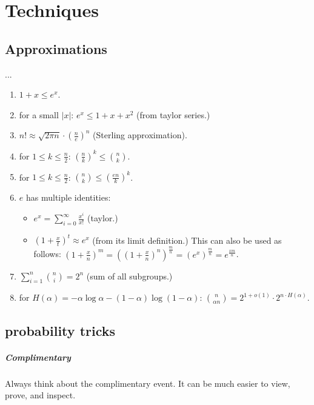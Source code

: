 \chapter{Techniques}
\section{Approximations}
...
\begin{enumerate}
    \item $1+x \le e^x$.
    \item for a small $|x|$: $e^x \le 1+x+x^2$ (from taylor series.)
    \item $n! \approx \sqrt{2\pi n} \cdot \left( \frac{n}{e}\right)^n$ (Sterling approximation).
    \item for $1\le k \le \frac{n}{2}$: $\left( \frac{n}{k}\right)^k \le \binom{n}{k}$.
    \item for $1\le k \le \frac{n}{2}$: $\binom{n}{k}\le\left(\frac{en}{k}\right)^{k}$.
    \item $e$ has multiple identities:
        \begin{itemize} 
          \item $e^{x}=\sum\limits _{i=0}^{\infty}\frac{x^{i}}{x!}$ (taylor.)
          \item $\left(1+\frac{x}{t}\right)^{t}\approx e^{x}$ (from its limit definition.) 
          This can also be used as follows: $\left(1+\frac{x}{n}\right)^{m}=\left(\left(1+\frac{x}{n}\right)^{n}\right)^{\frac{m}{n}}=\left(e^{x}\right)^{\frac{m}{n}}=e^{\frac{xm}{n}}$.
        \end{itemize}
    \item $\sum_{i=1}^{n}\binom{n}{i}=2^{n}$ (sum of all subgroups.)
    \item for $H\left(\alpha\right)=-\alpha\log\alpha-\left(1-\alpha\right)\log\left(1-\alpha\right)$: $\binom{n}{\alpha n}=2^{1+o\left(1\right)}\cdot2^{n\cdot H\left(\alpha\right)}$.
\end{enumerate}
\section{probability tricks}


\paragraph{\bf Complimentary}
Always think about the complimentary event. It can be much easier to view, prove, and inspect.


